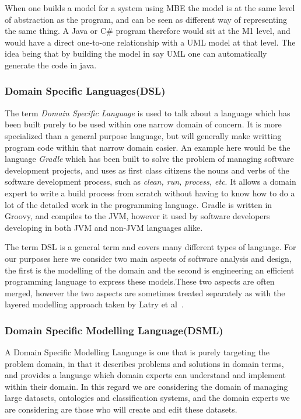 \documentclass{llncs}
\begin{document}
When one builds a model for a system using MBE the model is at the same level of abstraction as the program, and can be seen as different way of representing the same thing.  A Java or C\# program therefore would sit at the M1 level, and would have a direct one-to-one relationship with a UML model at that level. The idea being that by building the model in say UML one can automatically generate the code in java.

\subsubsection{Domain Specific Languages(DSL)}
The term \emph{Domain Specific Language} is used to talk about a language which has been built purely to be used within one narrow domain of concern. It is more specialized than a general purpose language, but will generally make writting program code within that narrow domain easier.  An example here would be the language \emph{Gradle} which has been built to solve the problem of managing software development projects, and uses as first class citizens the nouns and verbs of the software development process, such as \emph{clean, run, process, etc}. It allows a domain expert to write a build process from scratch without having to know how to do a lot of the detailed work in the programming language. Gradle is written in Groovy, and compiles to the JVM, however it used by software developers developing in both JVM and non-JVM languages alike.

The term DSL is a general term and covers many different types of language.  For our purposes here we consider two main aspects of software analysis and design, the first is the modelling of the domain and the second is engineering an efficient programming language to express these models.These two aspects are often merged, however the two aspects are sometimes treated separately as with the layered modelling approach taken by Latry et al~\cite{latry2006processing}. 


\subsubsection{Domain Specific Modelling Language(DSML)}

A Domain Specific Modelling Language is one that is purely targeting the problem domain, in that it describes problems and solutions in domain terms, and provides a language which domain experts can understand and implement within their domain. In this regard we are considering the domain of managing large datasets, ontologies and classification systems, and the domain experts we are considering are those who will create and edit these datasets. 
\end{document}
